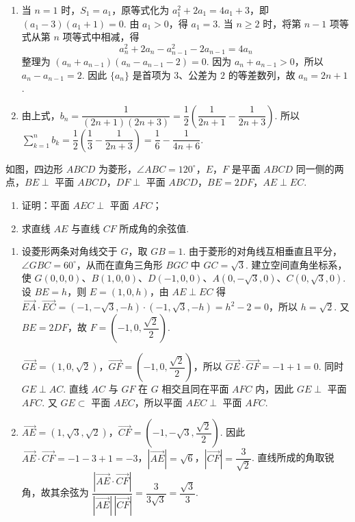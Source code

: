 \begin{solution}
\begin{enumerate}
\item 当 \(n=1\) 时，\(S_1=a_1\)，原等式化为 \(a_1^2+2a_1=4a_1+3\)，即 \((a_1-3)(a_1+1)=0\). 由 \(a_1>0\)，得 \(a_1=3\). 当 \(n\geqslant2\) 时，将第 \(n-1\) 项等式从第 \(n\) 项等式中相减，得
\[
a_n^2+2a_n-a_{n-1}^2-2a_{n-1}=4a_n
\]
整理为 \((a_n+a_{n-1})(a_n-a_{n-1}-2)=0\). 因为 \(a_n+a_{n-1}>0\)，所以 \(a_n-a_{n-1}=2\). 因此 \(\{a_n\}\) 是首项为 \(3\)、公差为 \(2\) 的等差数列，故 \(a_n=2n+1\).
\item 由上式，\(b_n=\dfrac{1}{(2n+1)(2n+3)}=\dfrac12\left(\dfrac{1}{2n+1}-\dfrac{1}{2n+3}\right)\). 所以
\(\displaystyle\sum_{k=1}^{n}b_k=\dfrac12\left(\dfrac13-\dfrac{1}{2n+3}\right)=\dfrac16-\dfrac{1}{4n+6}\).
\end{enumerate}
\end{solution}

\begin{problem}
如图，四边形 \(ABCD\) 为菱形，\(\angle ABC = 120^{\circ}\)，\(E\)，\(F\) 是平面 \(ABCD\) 同一侧的两点，\(BE \perp\) 平面 \(ABCD\)，\(DF \perp\) 平面 \(ABCD\)，\(BE = 2DF\)，\(AE \perp EC\).

\begin{enumerate}
\item 证明：平面 \(AEC \perp\) 平面 \(AFC\)；
\item 求直线 \(AE\) 与直线 \(CF\) 所成角的余弦值.
\end{enumerate}

\end{problem}

\begin{solution}
\begin{enumerate}
\item 设菱形两条对角线交于 \(G\)，取 \(GB=1\). 由于菱形的对角线互相垂直且平分，\(\angle GBC=60^{\circ}\)，从而在直角三角形 \(BGC\) 中 \(GC=\sqrt3\). 建立空间直角坐标系，使
\(G(0,0,0)\)、\(B(1,0,0)\)、\(D(-1,0,0)\)、\(A(0,-\sqrt3,0)\)、\(C(0,\sqrt3,0)\). 设 \(BE=h\)，则 \(E=(1,0,h)\)，由 \(AE\perp EC\) 得
\(\overrightarrow{EA}\cdot\overrightarrow{EC}=(-1,-\sqrt3,-h)\cdot(-1,\sqrt3,-h)=h^2-2=0\)，所以 \(h=\sqrt2\). 又 \(BE=2DF\)，故 \(F=(-1,0,\dfrac{\sqrt2}{2})\).

\(\overrightarrow{GE}=(1,0,\sqrt2)\)，\(\overrightarrow{GF}=(-1,0,\dfrac{\sqrt2}{2})\)，所以 \(\overrightarrow{GE}\cdot\overrightarrow{GF}=-1+1=0\). 同时 \(GE\perp AC\). 直线 \(AC\) 与 \(GF\) 在 \(G\) 相交且同在平面 \(AFC\) 内，因此 \(GE\perp\) 平面 \(AFC\). 又 \(GE\subset\) 平面 \(AEC\)，所以平面 \(AEC\perp\) 平面 \(AFC\).
\item \(\overrightarrow{AE}=(1,\sqrt3,\sqrt2)\)，\(\overrightarrow{CF}=(-1,-\sqrt3,\dfrac{\sqrt2}{2})\). 因此
\(\overrightarrow{AE}\cdot\overrightarrow{CF}=-1-3+1=-3\)，\(|\overrightarrow{AE}|=\sqrt6\)，\(|\overrightarrow{CF}|=\dfrac{3}{\sqrt2}\). 直线所成的角取锐角，故其余弦为
\(\dfrac{|\overrightarrow{AE}\cdot\overrightarrow{CF}|}{|\overrightarrow{AE}|\,|\overrightarrow{CF}|}=\dfrac{3}{3\sqrt3}=\dfrac{\sqrt3}{3}\).
\end{enumerate}
\end{solution}


